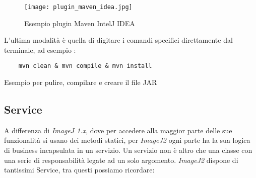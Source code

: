 \begin{figure}[H]
    \centering
    \texttt{[image: plugin\_maven\_idea.jpg]}
    \caption{Esempio plugin Maven IntelJ IDEA}
    \label{fig:8}
\end{figure}

\noindent L'ultima modalità è quella di digitare i comandi specifici direttamente dal terminale, ad esempio :

\begin{listing}[H]
\begin{verbatim}
    mvn clean & mvn compile & mvn install
\end{verbatim}
\caption{Esempio per pulire, compilare e creare il file JAR}\label{lst:mvn}
\end{listing}

\subsection{Service}
\noindent A differenza di \textit{ImageJ 1.x}, dove per accedere alla maggior parte delle sue funzionalità si usano dei metodi statici, per \textit{ImageJ2} ogni parte ha la sua logica di business incapsulata in un servizio. Un servizio non è altro che una classe con una serie di responsabilità legate ad un solo argomento. \textit{ImageJ2} dispone di tantissimi Service, tra questi possiamo ricordare:
